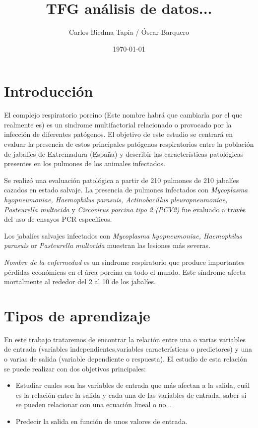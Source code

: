 \documentclass[12pt,a4paper,Spanish]{book}
\author{Carlos Biedma Tapia / Óscar Barquero}
\title{TFG análisis de datos...}
\date{\today}
\begin{document}
\maketitle
\tableofcontents
\listoffigures


\chapter{Introducción}
El complejo respiratorio porcino (Este nombre habrá que cambiarla por el que realmente es) es un sindrome multifactorial relacionado o provocado por la infección de diferentes patógenos. El objetivo de este estudio se centrará en evaluar la presencia de estos principales patógenos respiratorios entre la población de jabalíes de Extremadura (España) y describir las características patológicas presentes en los pulmones de los animales infectados.

Se realizó una evaluación patológica a partir de 210 pulmones de 210 jabalíes cazados en estado salvaje. La presencia de pulmones infectados con \textit{Mycoplasma hyopneumoniae, Haemophilus parasuis, Actinobacillus pleuropneumoniae, Pasteurella multocida} y \textit{Circovirus porcina tipo 2 (PCV2)} fue evaluado a través del uso de ensayos PCR específicos.

Los jabalíes salvajes infectados con \textit{Mycoplasma hyopneumoniae, Haemophilus parasuis} or
\textit{Pasteurella multocida} muestran las lesiones más severas.

\textit{Nombre de la enfermedad} es un sindrome respiratorio que produce importantes pérdidas económicas en el área porcina en todo el mundo. Este síndrome afecta mortalmente al rededor del 2 al 10 de los jabalíes.


\chapter{Tipos de aprendizaje}

En este trabajo trataremos de encontrar la relación entre una o varias variables de entrada (variables independientes,variables características o predictores) y una o varias de salida (variable dependiente o respuesta). El estudio de esta relación se puede realizar con dos objetivos principales:


\begin{itemize}
\item Estudiar cuales son las variables de entrada que más afectan a la salida, cuál es la relación entre la salida y cada una de las variables de entrada, saber si se pueden relacionar con una ecuación lineal o no... 

\item Predecir la salida en función de unos valores de entrada.
\end{itemize}
\end{document}
